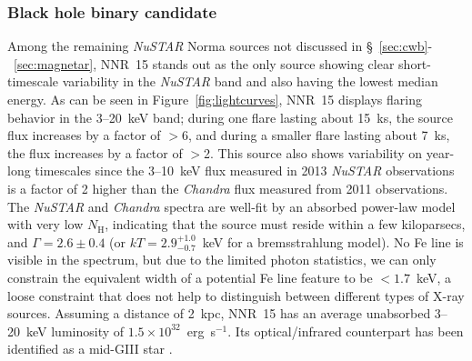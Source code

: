 \documentclass[iop,revtex4]{emulateapj}
\begin{document}
\subsubsection{Black hole binary candidate}
\label{sec:bhcandidate}
Among the remaining \textit{NuSTAR} Norma sources not discussed in \S~\ref{sec:cwb}-~\ref{sec:magnetar}, NNR~15 stands out as the only source showing clear short-timescale variability in the \textit{NuSTAR} band and also having the lowest median energy.  As can be seen in Figure~\ref{fig:lightcurves}, NNR~15 displays flaring behavior in the 3--20~keV band; during one flare lasting about 15~ks, the source flux increases by a factor of $>$6, and during a smaller flare lasting about 7~ks, the flux increases by a factor of $>$2.  This source also shows variability on year-long timescales since the 3--10~keV flux measured in 2013 \textit{NuSTAR} observations is a factor of 2 higher than the \textit{Chandra} flux measured from 2011 observations.  The \textit{NuSTAR} and \textit{Chandra} spectra are well-fit by an absorbed power-law model with very low $N_{\mathrm{H}}$, indicating that the source must reside within a few kiloparsecs, and $\Gamma=2.6\pm0.4$ (or $kT=2.9^{+1.0}_{-0.7}$~keV for a bremsstrahlung model).  No Fe line is visible in the spectrum, but due to the limited photon statistics, we can only constrain the equivalent width of a potential Fe line feature to be $<1.7$~keV, a loose constraint that does not help to distinguish between different types of X-ray sources.  Assuming a distance of 2~kpc, NNR~15 has an average unabsorbed 3--20~keV luminosity of $1.5\times10^{32}$~erg~s$^{-1}$. Its optical/infrared counterpart has been identified as a mid-GIII star \citep{rahoui14}.  \par
\end{document}
